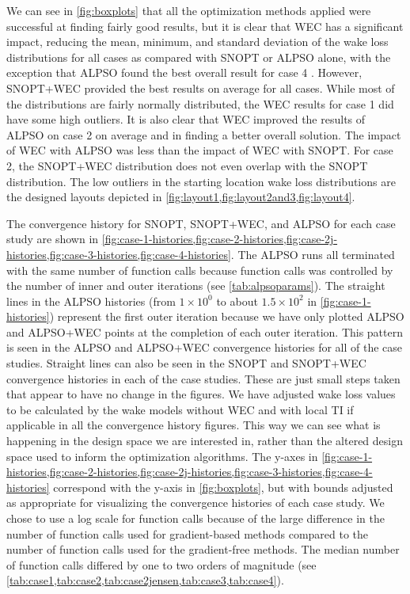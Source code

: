 \documentclass[journal abbreviation, manuscript]{copernicus}
\begin{document}
	We can see in \ref{fig:boxplots} that all the optimization methods applied were successful at finding fairly good results, but it is clear that WEC has a significant impact, reducing the mean, minimum, and standard deviation of the wake loss distributions for all cases as compared with SNOPT or ALPSO alone, with the exception that ALPSO found the best overall result for case 4 . However, SNOPT+WEC  provided the best results on average for all cases. While most of the distributions are fairly normally distributed, the WEC results for case 1 did have some high outliers. It is also clear that WEC improved the results of ALPSO on case 2 on average and in finding a better overall solution. The impact of WEC with ALPSO was less than the impact of WEC with SNOPT. For case 2, the SNOPT+WEC distribution does not even overlap with the SNOPT distribution. The low outliers in the starting location wake loss distributions are the designed layouts depicted in \ref{fig:layout1,fig:layout2and3,fig:layout4}.
	
	The convergence history for SNOPT, SNOPT+WEC, and ALPSO for each case study are shown in \ref{fig:case-1-histories,fig:case-2-histories,fig:case-2j-histories,fig:case-3-histories,fig:case-4-histories}. The ALPSO runs all terminated with the same number of function calls because function calls was controlled by the number of inner and outer iterations (see \ref{tab:alpsoparams}). The straight lines in the ALPSO histories (from $1\times10^0$ to about $1.5\times10^2$ in \ref{fig:case-1-histories}) represent the first outer iteration because we have only plotted ALPSO and ALPSO+WEC points at the completion of each outer iteration. This pattern is seen in the ALPSO and ALPSO+WEC convergence histories for all of the case studies. Straight lines can also be seen in the SNOPT and SNOPT+WEC convergence histories in each of the case studies. These are just small steps taken that appear to have no change in the figures. We have adjusted wake loss values to be calculated by the wake models without WEC and with local TI if applicable in all the convergence history figures. This way we can see what is happening in the design space we are interested in, rather than the altered design space used to inform the optimization algorithms. The y-axes in \ref{fig:case-1-histories,fig:case-2-histories,fig:case-2j-histories,fig:case-3-histories,fig:case-4-histories} correspond with the y-axis in \ref{fig:boxplots}, but with bounds adjusted as appropriate for visualizing the convergence histories of each case study. We chose to use a log scale for function calls because of the large difference in the number of function calls used for gradient-based methods compared to the number of function calls used for the gradient-free methods. The median number of function calls differed by one to two orders of magnitude (see \ref{tab:case1,tab:case2,tab:case2jensen,tab:case3,tab:case4}).
	
\end{document}
